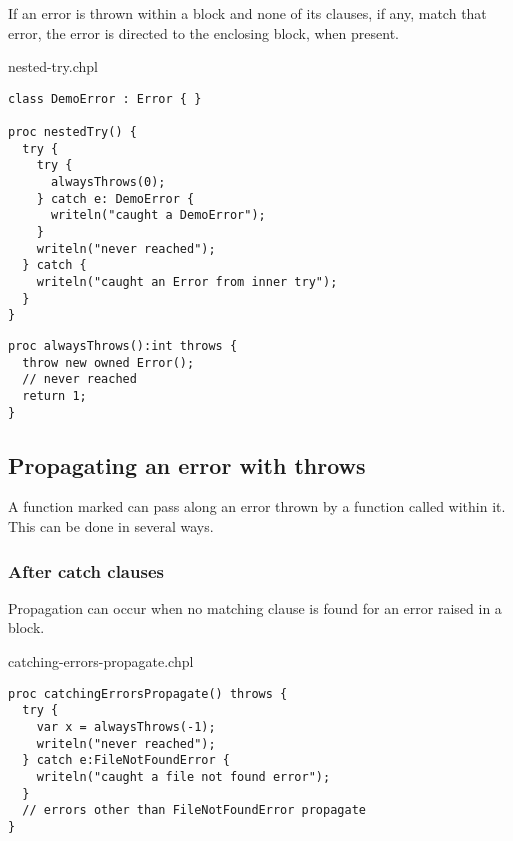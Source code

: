If an error is thrown within a  block and none of its
 clauses, if any, match that error, the error
is directed to the enclosing  block, when present.

\begin{chapelexample}{nested-try.chpl}
\begin{chapel}
\begin{verbatim}
class DemoError : Error { }

proc nestedTry() {
  try {
    try {
      alwaysThrows(0);
    } catch e: DemoError {
      writeln("caught a DemoError");
    }
    writeln("never reached");
  } catch {
    writeln("caught an Error from inner try");
  }
}
\end{verbatim}
\end{chapel}
\begin{chapelpost}
\begin{verbatim}
proc alwaysThrows():int throws {
  throw new owned Error();
  // never reached
  return 1;
}
\end{verbatim}
\end{chapelpost}
\end{chapelexample}

\subsection{Propagating an error with throws}
\label{Propagating_an_error_with_throws}

A function marked  can pass along an error thrown by a
function called within it. This can be done in several ways.

\subsubsection{After catch clauses}
\label{After_catch_clauses}

Propagation can occur when no matching  clause is found for an
error raised in a  block.

\begin{chapelexample}{catching-errors-propagate.chpl}
\begin{chapel}
\begin{verbatim}
proc catchingErrorsPropagate() throws {
  try {
    var x = alwaysThrows(-1);
    writeln("never reached");
  } catch e:FileNotFoundError {
    writeln("caught a file not found error");
  }
  // errors other than FileNotFoundError propagate
}
\end{verbatim}
\end{chapel}
\end{chapelexample}

